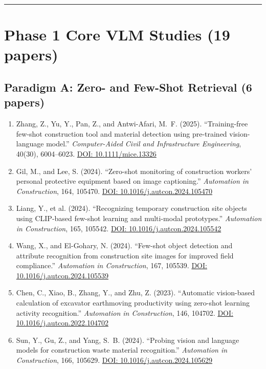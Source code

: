 \documentclass[11pt]{article}
\begin{document}
\vspace{0.3em}
\noindent\rule{\linewidth}{0.4pt}

\section{Phase 1 Core VLM Studies (19 papers)}

\subsection{Paradigm A: Zero- and Few-Shot Retrieval (6 papers)}

\begin{enumerate}[label=\textbf{A\arabic*.}]

\item Zhang, Z., Yu, Y., Pan, Z., and Antwi-Afari, M.~F. (2025). ``Training-free few-shot construction tool and material detection using pre-trained vision-language model.'' \textit{Computer-Aided Civil and Infrastructure Engineering}, 40(30), 6004--6023. \href{https://doi.org/10.1111/mice.13326}{DOI: 10.1111/mice.13326}

\item Gil, M., and Lee, S. (2024). ``Zero-shot monitoring of construction workers' personal protective equipment based on image captioning.'' \textit{Automation in Construction}, 164, 105470. \href{https://doi.org/10.1016/j.autcon.2024.105470}{DOI: 10.1016/j.autcon.2024.105470}

\item Liang, Y., et al. (2024). ``Recognizing temporary construction site objects using CLIP-based few-shot learning and multi-modal prototypes.'' \textit{Automation in Construction}, 165, 105542. \href{https://doi.org/10.1016/j.autcon.2024.105542}{DOI: 10.1016/j.autcon.2024.105542}

\item Wang, X., and El-Gohary, N. (2024). ``Few-shot object detection and attribute recognition from construction site images for improved field compliance.'' \textit{Automation in Construction}, 167, 105539. \href{https://doi.org/10.1016/j.autcon.2024.105539}{DOI: 10.1016/j.autcon.2024.105539}

\item Chen, C., Xiao, B., Zhang, Y., and Zhu, Z. (2023). ``Automatic vision-based calculation of excavator earthmoving productivity using zero-shot learning activity recognition.'' \textit{Automation in Construction}, 146, 104702. \href{https://doi.org/10.1016/j.autcon.2022.104702}{DOI: 10.1016/j.autcon.2022.104702}

\item Sun, Y., Gu, Z., and Yang, S.~B. (2024). ``Probing vision and language models for construction waste material recognition.'' \textit{Automation in Construction}, 166, 105629. \href{https://doi.org/10.1016/j.autcon.2024.105629}{DOI: 10.1016/j.autcon.2024.105629}

\end{enumerate}
\end{document}
